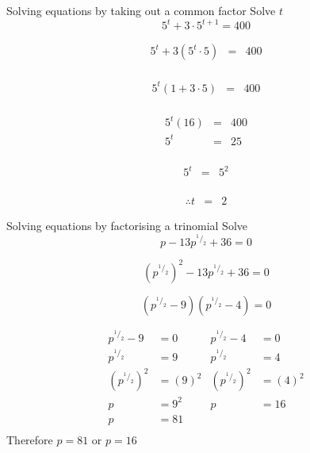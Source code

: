 


\begin{wex}
{%
Solving equations by taking out a common factor
}
{%
Solve $t$
$$ 5^t + 3 \cdot 5^{t+1} = 400 $$
}
{%

\begin{eqnarray*}
 5^t + 3 ( 5^t \cdot 5) & = & 400 \\
\end{eqnarray*}

\begin{eqnarray*}
 5^t(1 + 3 \cdot 5) & = & 400 \\
\end{eqnarray*}



\begin{eqnarray*}
 5^t(16) & = & 400 \\
  5^t & = & 25 \\
\end{eqnarray*}


\begin{eqnarray*}
  5^t & = & 5^2 \\
\end{eqnarray*}


\begin{eqnarray*}
\therefore t & = & 2
\end{eqnarray*}

}
\end{wex}

\begin{wex}
{%
Solving equations by factorising a trinomial
}
{%
Solve
$$ p-13 p^{^1/_2} + 36 =  0$$
}
{ %


$$ (p^{^1/_2})^2 -13p^{^1/_2} + 36 = 0 $$


$$ (p^{^1/_2} -9)(p^{^1/_2}-4) = 0 $$


\begin{align*}
p^{^1/_2} - 9 &= 0			&   p^{^1/_2} - 4 &= 0		\\
p^{^1/_2} &= 9				&   p^{^1/_2} &= 4		\\		
(p^{^1/_2})^2 &= (9)^2			&   (p^{^1/_2})^2 &= (4)^2\\
p &= 9^2				&   p &= 16\\
p &= 81					&\\
\end{align*} 
Therefore $p=81$ or $p=16$


}
\end{wex}

